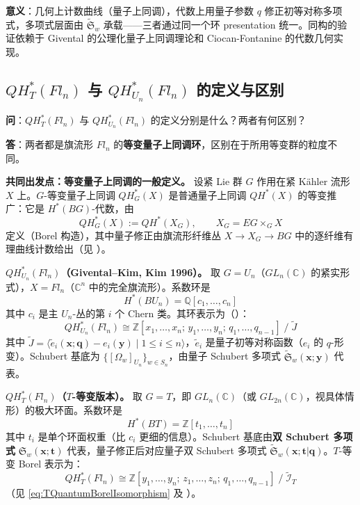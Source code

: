 \textbf{意义}：几何上计数曲线（量子上同调），代数上用量子参数 $q$ 修正初等对称多项式，多项式层面由 $\widetilde{\mathfrak{S}}_w$ 承载——三者通过同一个环 presentation 统一。同构的验证依赖于 Givental 的公理化量子上同调理论和 Ciocan-Fontanine 的代数几何实现。


\subsection{$QH_T^*(Fl_n)$ 与 $QH_{U_n}^*(Fl_n)$ 的定义与区别}\label{sec:qa-QH-T-vs-Un}

\textbf{问}：$QH_T^*(Fl_n)$ 与 $QH_{U_n}^*(Fl_n)$ 的定义分别是什么？两者有何区别？

\textbf{答}：两者都是旗流形 $Fl_n$ 的\textbf{等变量子上同调环}，区别在于所用等变群的粒度不同。

\textbf{共同出发点：等变量子上同调的一般定义。} 设紧 Lie 群 $G$ 作用在紧 Kähler 流形 $X$ 上。$G$-等变量子上同调 $QH_G^*(X)$ 是普通量子上同调 $QH^*(X)$ 的等变推广：它是 $H^*(BG)$-代数，由
$$QH_G^*(X) := QH^*(X_G), \qquad X_G = EG \times_G X$$
定义（Borel 构造），其中量子修正由旗流形纤维丛 $X \to X_G \to BG$ 中的逐纤维有理曲线计数给出（见 \cite[§3.3]{Kim1996}）。

\textbf{$QH_{U_n}^*(Fl_n)$（Givental--Kim, Kim 1996）。} 取 $G = U_n$（$GL_n(\mathbb{C})$ 的紧实形式），$X = Fl_n$（$\mathbb{C}^n$ 中的完全旗流形）。系数环是
$$H^*(BU_n) = \mathbb{Q}[c_1,\ldots,c_n]$$
其中 $c_i$ 是主 $U_n$-丛的第 $i$ 个 Chern 类。其环表示为（\cite[Theorem 2]{Kim1996}）：
$$QH_{U_n}^*(Fl_n) \cong \mathbb{Z}[x_1,\ldots,x_n;\, y_1,\ldots,y_n;\, q_1,\ldots,q_{n-1}]\;/\;\widetilde{J}$$
其中 $\widetilde{J} = \langle \widetilde{e}_i(\mathbf{x};\mathbf{q}) - e_i(\mathbf{y}) \mid 1 \le i \le n \rangle$，$\widetilde{e}_i$ 是量子初等对称函数（$e_i$ 的 $q$-形变）。Schubert 基底为 $\{[\Omega_w]_{U_n}\}_{w \in S_n}$，由量子 Schubert 多项式 $\widetilde{\mathfrak{S}}_w(\mathbf{x};\mathbf{y})$ 代表。

\textbf{$QH_T^*(Fl_n)$（$T$-等变版本）。} 取 $G = T$，即 $GL_n(\mathbb{C})$（或 $GL_{2n}(\mathbb{C})$，视具体情形）的极大环面。系数环是
$$H^*(BT) = \mathbb{Z}[t_1,\ldots,t_n]$$
其中 $t_i$ 是单个环面权重（比 $c_i$ 更细的信息）。Schubert 基底由\textbf{双 Schubert 多项式} $\mathfrak{S}_w(\mathbf{x};\mathbf{t})$ 代表，量子修正后对应量子双 Schubert 多项式 $\widetilde{\mathfrak{S}}_w(\mathbf{x};\mathbf{t}|\mathbf{q})$。$T$-等变 Borel 表示为：
$$QH_T^*(Fl_n) \cong \mathbb{Z}[y_1,\ldots,y_n;\, z_1,\ldots,z_n;\, q_1,\ldots,q_{n-1}]\;/\;\widetilde{\mathcal{I}}_T$$
（见 \cref{eq:TQuantumBorelIsomorphism} 及 \cite[Theorem~2]{Kim1996}）。

